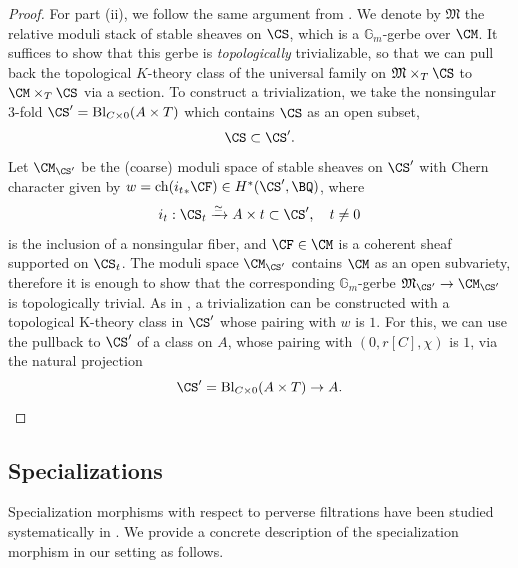 \begin{proof}
For part (ii), we follow the same argument from \cite[Section 3.1]{Markman5}. We denote by $\mathfrak{M}$ the relative moduli stack of stable sheaves on $\CS$, which is a $\mathbb{G}_m$-gerbe over $\CM$. It suffices to show that this gerbe is \emph{topologically} trivializable, so that we can pull back the topological $K$-theory class of the universal family on $\mathfrak{M}\times_T\CS$ to $\CM\times_T \CS$ via a section.  To construct a trivialization, we take the nonsingular 3-fold $\CS'= \mathrm{Bl}_{C\times 0}(A \times T)$ which contains $\CS$ as an open subset,
\[
\CS \subset \CS'.
\]
Let $\CM_{\CS'}$ be the (coarse) moduli space of stable sheaves on $\CS'$ with Chern character given by $w =\mathrm{ch}({i_t}_\ast \CF) \in H^*(\CS', \BQ)$, where
\[
i_t: \CS_t \xrightarrow{\simeq} A\times t \subset \CS', \quad t\neq 0
\]
is the inclusion of a nonsingular fiber, and $\CF \in \CM$ is a coherent sheaf supported on $\CS_t$. The moduli space $\CM_{\CS'}$ contains $\CM$ as an open subvariety, therefore it is enough to show that the corresponding $\mathbb{G}_m$-gerbe $\mathfrak{M}_{\CS'} \rightarrow \CM_{\CS'}$ is topologically trivial. As in \cite[Section 3.1]{Markman5}, a trivialization can be constructed with a topological K-theory class in $\CS'$ whose pairing with $w$ is $1$. For this, we can use the pullback to $\CS'$ of a class on $A$, whose pairing with $(0 ,r[C], \chi)$ is $1$, via the natural projection
\[
\CS' = \mathrm{Bl}_{C\times 0}(A\times T) \to A. \qedhere
\]
\end{proof}




\subsection{Specializations}\label{section4.3} Specialization morphisms with respect to perverse filtrations have been studied systematically in \cite{dCM,sp}. We provide a concrete description of the specialization morphism in our setting as follows.

